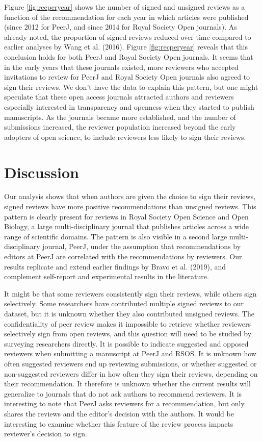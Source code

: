 \documentclass[
  english,
  ,jou, a4paper,floatsintext]{apa6}
\begin{document}
Figure \ref{fig:recperyear} shows the number of signed and unsigned reviews as a function of the recommendation for each year in which articles were published (since 2012 for PeerJ, and since 2014 for Royal Society Open journals). As already noted, the proportion of signed reviews reduced over time compared to earlier analyses by Wang et al. (2016). Figure \ref{fig:recperyear} reveals that this conclusion holds for both PeerJ and Royal Society Open journals. It seems that in the early years that these journals existed, more reviewers who accepted invitations to review for PeerJ and Royal Society Open journals also agreed to sign their reviews. We don't have the data to explain this pattern, but one might speculate that these open access journals attracted authors and reviewers especially interested in transparency and openness when they started to publish manuscripts. As the journals became more established, and the number of submissions increased, the reviewer population increased beyond the early adopters of open science, to include reviewers less likely to sign their reviews.

\hypertarget{discussion}{%
\section{Discussion}\label{discussion}}

Our analysis shows that when authors are given the choice to sign their reviews, signed reviews have more positive recommendations than unsigned reviews. This pattern is clearly present for reviews in Royal Society Open Science and Open Biology, a large multi-disciplinary journal that publishes articles across a wide range of scientific domains. The pattern is also visible in a second large multi-disciplinary journal, PeerJ, under the assumption that recommendations by editors at PeerJ are correlated with the recommendations by reviewers. Our results replicate and extend earlier findings by Bravo et al. (2019), and complement self-report and experimental results in the literature.

It might be that some reviewers consistently sign their reviews, while others sign selectively. Some researchers have contributed multiple signed reviews to our dataset, but it is unknown whether they also contributed unsigned reviews. The confidentiality of peer review makes it impossible to retrieve whether reviewers selectively sign from open reviews, and this question will need to be studied by surveying researchers directly. It is possible to indicate suggested and opposed reviewers when submitting a manuscript at PeerJ and RSOS. It is unknown how often suggested reviewers end up reviewing submissions, or whether suggested or non-suggested reviewers differ in how often they sign their reviews, depending on their recommendation. It therefore is unknown whether the current results will generalize to journals that do not ask authors to recommend reviewers. It is interesting to note that PeerJ asks reviewers for a recommendation, but only shares the reviews and the editor's decision with the authors. It would be interesting to examine whether this feature of the review process impacts reviewer's decision to sign.
\end{document}
